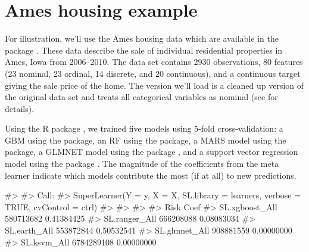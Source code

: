 \section{Ames housing example}

For illustration, we'll use the Ames housing data \citep{ames-cock-2011}
which are available in the  package
\citep{R-AmesHousing}. These data describe the sale of individual
residential properties in Ames, Iowa from 2006--2010. The data set
contains 2930 observations, 80 features (23 nominal, 23 ordinal, 14
discrete, and 20 continuous), and a continuous target giving the sale
price of the home. The version we'll load is a cleaned up version of the
original data set and treats all categorical variables as nominal (see
 for details).

Using the R package  \citep{R-SuperLearner}, we
trained five models using 5-fold cross-validation: a GBM using the
 package, an RF using the  package, a MARS
model using the  package, a GLMNET model using the
 package \citep{R-glmnet}, and a support vector
regression model using the  package \citep{R-kernlab}.
The magnitude of the coefficients from the meta learner indicate which
models contribute the most (if at all) to new predictions.

\begin{Schunk}
\begin{Soutput}
#>
#> Call:
#> SuperLearner(Y = y, X = X, SL.library = learners, verbose = TRUE, cvControl = ctrl)
#>
#>
#>
#>                      Risk       Coef
#> SL.xgboost_All  580713682 0.41384425
#> SL.ranger_All   666208088 0.08083034
#> SL.earth_All    553872844 0.50532541
#> SL.glmnet_All   908881559 0.00000000
#> SL.ksvm_All    6784289108 0.00000000
\end{Soutput}
\end{Schunk}

